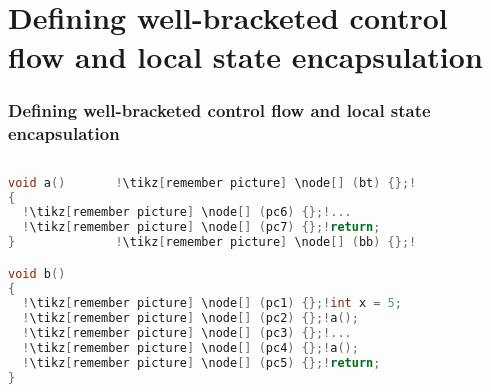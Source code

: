 \documentclass[aspectratio=169]{beamer}
\begin{document}
\section{Defining well-bracketed control flow and local state  encapsulation}

\newcommand{\drawpc}[1]{

}

\begin{frame}[fragile]
  \frametitle{Defining well-bracketed control flow and local state encapsulation}
  \begin{columns}
    \begin{column}{0.5\textwidth}
\begin{lstlisting}[language=C, escapechar=!]
void a()       !\tikz[remember picture] \node[] (bt) {};! 
{
  !\tikz[remember picture] \node[] (pc6) {};!...
  !\tikz[remember picture] \node[] (pc7) {};!return;      
}              !\tikz[remember picture] \node[] (bb) {};!

void b()
{
  !\tikz[remember picture] \node[] (pc1) {};!int x = 5;
  !\tikz[remember picture] \node[] (pc2) {};!a();
  !\tikz[remember picture] \node[] (pc3) {};!...
  !\tikz[remember picture] \node[] (pc4) {};!a();
  !\tikz[remember picture] \node[] (pc5) {};!return;   
}
\end{lstlisting}
    \end{column}
    \begin{column}{0.5\textwidth}
    \end{column}
  \end{columns}
\end{frame}
\end{document}
